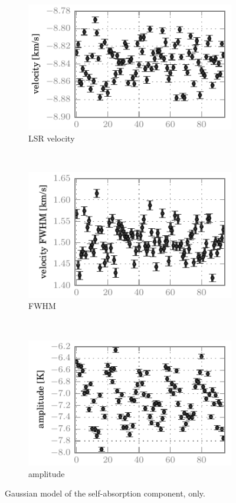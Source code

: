 \begin{figure}[hbtp]
    \centering
    \begin{subfigure}[b]{0.5\textwidth}
        \includegraphics{co87_sabs_velo}
        \caption{ LSR velocity}
    \end{subfigure}%
    \\
    \begin{subfigure}[b]{0.5\textwidth}
        \includegraphics{co87_sabs_vfwh}
        \caption{ FWHM}
    \end{subfigure}%
    \\
    \begin{subfigure}[b]{0.5\textwidth}
        \includegraphics{co87_sabs_ampl}
        \caption{ amplitude}
    \end{subfigure}%
    \caption{
        Gaussian model of the self-absorption component,  only.
    }
    \label{fig:fit_sabs}
\end{figure}

